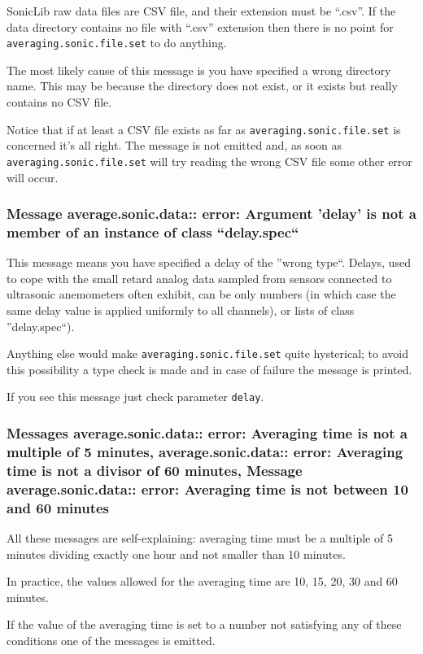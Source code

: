 \documentclass[a4paper,10pt]{book}
\begin{document}
SonicLib raw data files are CSV file, and their extension must be ``.csv''. If the data directory contains no file with ``.csv'' extension then there is no point for \verb|averaging.sonic.file.set| to do anything.

The most likely cause of this message is you have specified a wrong directory name. This may be because the directory does not exist, or it exists but really contains no CSV file.

Notice that if at least a CSV file exists as far as \verb|averaging.sonic.file.set| is concerned it's all right. The message is not emitted and, as soon as \verb|averaging.sonic.file.set| will try reading the wrong CSV file some other error will occur.


\subsubsection{Message average.sonic.data:: error: Argument 'delay' is not a member of an instance of class ``delay.spec``}

This message means you have specified a delay of the ''wrong type``. Delays, used to cope with the small retard analog data sampled from sensors connected to ultrasonic anemometers often exhibit, can be only numbers (in which case the same delay value is applied uniformly to all channels), or lists of class ''delay.spec``).

Anything else would make \verb|averaging.sonic.file.set| quite hysterical; to avoid this possibility a type check is made and in case of failure the message is printed.

If you see this message just check parameter \verb|delay|.

\subsubsection{Messages average.sonic.data:: error: Averaging time is not a multiple of 5 minutes, average.sonic.data:: error: Averaging time is not a divisor of 60 minutes, Message average.sonic.data:: error: Averaging time is not between 10 and 60 minutes}

All these messages are self-explaining: averaging time must be a multiple of 5 minutes dividing exactly one hour and not smaller than 10 minutes.

In practice, the values allowed for the averaging time are 10, 15, 20, 30 and 60 minutes.

If the value of the averaging time is set to a number not satisfying any of these conditions one of the messages is emitted.
\end{document}
